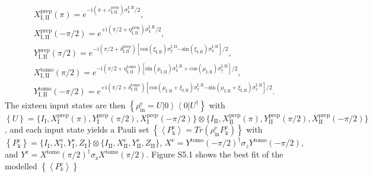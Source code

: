 \[
\begin{array}{c}
X_{\mathrm{I,II}}^{\mathrm{prep}}(\pi)=e^{-\mathrm{i}\left(\pi+\varepsilon_{\mathrm{I,II}}^{\mathrm{prep}}\right)\sigma_{\mathrm{x}}^{\mathrm{I,II}}/2},\\
X_{\mathrm{I,II}}^{\mathrm{prep}}(-\pi/2)=e^{+\mathrm{i}\left(\pi/2+\eta_{\mathrm{I,II}}^{\mathrm{prep}}\right)\sigma_{\mathrm{x}}^{\mathrm{I,II}}/2},\\
Y_{\mathrm{I,II}}^{\mathrm{prep}}(\pi/2)=e^{-\mathrm{i}\left(\pi/2+\delta_{\mathrm{I,II}}^{\mathrm{prep}}\right)\left[\mathrm{cos}\left(\xi_{\mathrm{I,II}}\right)\sigma_{\mathrm{y}}^{\mathrm{I,II}}\mathrm{-sin}\left(\xi_{\mathrm{I,II}}\right)\sigma_{\mathrm{x}}^{\mathrm{I,II}}\right]/2},\\
X_{\mathrm{I,II}}^{\mathrm{tomo}}(\pi/2)=e^{-\mathrm{i}\left(\pi/2+\eta_{\mathrm{I,II}}^{\mathrm{tomo}}\right)\left[\mathrm{\mathrm{sin}\left(\mu_{I,II}\right)\sigma_{x}^{I,II}+cos}\left(\mu_{\mathrm{I,II}}\right)\sigma_{\mathrm{y}}^{\mathrm{I,II}}\right]/2},\\
Y_{\mathrm{I,II}}^{\mathrm{tomo}}(-\pi/2)=e^{+\mathrm{i}\left(\pi/2+\delta_{\mathrm{I,II}}^{\mathrm{tomo}}\right)\left[\mathrm{cos}\left(\mu_{\mathrm{I,II}}+\xi_{\mathrm{I,II}}\right)\sigma_{\mathrm{y}}^{\mathrm{I,II}}\mathrm{-sin}\left(\mu_{\mathrm{I,II}}+\xi_{\mathrm{I,II}}\right)\sigma_{x}^{\mathrm{I,II}}\right]/2}.\end{array}\]
The sixteen input states are then $\left\{ \rho_{\mathrm{in}}^{\mathrm{e}}=U\left|0\right\rangle \left\langle 0\right|U^{\dagger}\right\} $
with $\left\{ U\right\} =\{I_{\mathrm{I}},X_{\mathrm{I}}^{\mathrm{prep}}(\pi),Y_{\mathrm{I}}^{\mathrm{prep}}(\pi/2),X_{\mathrm{I}}^{\mathrm{prep}}(-\pi/2)\}\otimes\{I_{\mathrm{II}},X_{\mathrm{II}}^{\mathrm{prep}}(\pi),Y_{\mathrm{II}}^{\mathrm{prep}}(\pi/2),X_{\mathrm{II}}^{\mathrm{prep}}(-\pi/2)\}$,
and each input state yields a Pauli set $\left\{ \left\langle P_{\mathrm{k}}^{\mathrm{e}}\right\rangle =Tr\left(\rho_{\mathrm{in}}^{\mathrm{e}}P_{\mathrm{k}}^{\mathrm{e}}\right)\right\} $
with $\left\{ P_{\mathrm{k}}^{\mathrm{e}}\right\} =\{I_{\mathrm{I}},X_{\mathrm{I}}^{\mathrm{e}},Y_{\mathrm{I}}^{\mathrm{e}},Z_{\mathrm{I}}\}\otimes\{I_{\mathrm{II}},X_{\mathrm{II}}^{\mathrm{e}},Y_{\mathrm{II}}^{\mathrm{e}},Z_{\mathrm{II}}\}$,
$X^{\mathrm{e}}=Y^{\mathrm{tomo}}(-\pi/2)^{\dagger}\sigma_{z}Y^{\mathrm{tomo}}(-\pi/2)$,
and $Y^{\mathrm{e}}=X^{\mathrm{tomo}}(\pi/2)^{\dagger}\sigma_{\mathrm{z}}X^{\mathrm{tomo}}(\pi/2)$.
Figure S5.1 shows the best fit of the modelled $\left\{ \left\langle P_{k}^{e}\right\rangle \right\} $
